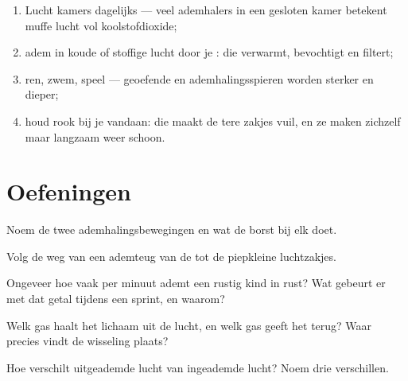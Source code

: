 \begin{method}\label{met:g4:breathing:care}
\begin{enumerate}
  \item Lucht kamers dagelijks --- veel ademhalers in een gesloten kamer
        betekent muffe lucht vol koolstofdioxide;
  \item adem in koude of stoffige lucht door je : die verwarmt,
        bevochtigt en filtert;
  \item ren, zwem, speel --- geoefende  en ademhalingsspieren
        worden sterker en dieper;
  \item houd rook bij je  vandaan: die maakt de tere zakjes vuil,
        en ze maken zichzelf maar langzaam weer schoon.
\end{enumerate}
\end{method}

\section{Oefeningen}

\begin{exercise}[$\star$]\label{exo:g4:breathing:1}
Noem de twee ademhalingsbewegingen en wat de borst bij elk doet.
\end{exercise}

\begin{exercise}[$\star$]\label{exo:g4:breathing:2}
Volg de weg van een ademteug van de  tot de piepkleine luchtzakjes.
\end{exercise}

\begin{exercise}[$\star$]\label{exo:g4:breathing:3}
Ongeveer hoe vaak per minuut ademt een rustig kind in rust? Wat gebeurt
er met dat getal tijdens een sprint, en waarom?
\end{exercise}

\begin{exercise}[$\star$]\label{exo:g4:breathing:4}
Welk gas haalt het lichaam uit de lucht, en welk gas geeft het terug?
Waar precies vindt de wisseling plaats?
\end{exercise}

\begin{exercise}[$\star$]\label{exo:g4:breathing:5}
Hoe verschilt uitgeademde lucht van ingeademde lucht? Noem drie verschillen.
\end{exercise}

